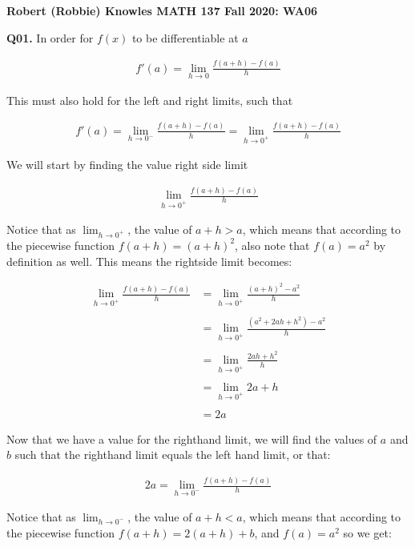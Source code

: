 \documentclass[12pt]{article}
\begin{document}
\parindent=0pt

\textbf{Robert (Robbie) Knowles MATH 137 Fall 2020: WA06}

\textbf{Q01.} In order for $f(x)$ to be differentiable at $a$

\begin{align*}
f'(a)=\lim_{h \to 0} \frac{f(a + h)-f(a)}{h}
\end{align*}

This must also hold for the left and right limits, such that

\begin{align*}
f'(a)=\lim_{h \to 0^-} \frac{f(a + h)-f(a)}{h} =  \lim_{h \to 0^+} \frac{f(a + h)-f(a)}{h} 
\end{align*}

We will start by finding the value right side limit

\begin{align*}
 \lim_{h \to 0^+} \frac{f(a + h)-f(a)}{h} 
\end{align*}

Notice that as $\lim_{h \to 0^+}$, the value of $a+h > a$, which means that according to the piecewise function $f(a+ h) = (a+h)^2$, also note that $f(a) = a^2$ by definition as well. This means the rightside limit becomes:

\begin{align*}
 \lim_{h \to 0^+} \frac{f(a + h)-f(a)}{h}  &= \lim_{h \to 0^+} \frac{(a + h)^2 -a^2}{h}\\\\
&= \lim_{h \to 0^+} \frac{(a^2+2ah+h^2) - a^2}{h}\\\\
&= \lim_{h \to 0^+} \frac{2ah+h^2}{h}\\\\
&= \lim_{h \to 0^+} 2a+h \\\\
& = 2a
\end{align*}

Now that we have a value for the righthand limit, we will find the values of $a$ and $b$ such that the righthand limit equals the left hand limit, or that:

\begin{align*}
2a = \lim_{h \to 0^-} \frac{f(a + h)-f(a)}{h}
\end{align*}

Notice that  as $\lim_{h \to 0^-}$, the value of $a+h < a$, which means that according to the piecewise function $f(a+ h) = 2(a+h)+b$, and  $f(a) = a^2$  so we get:
\end{document}
